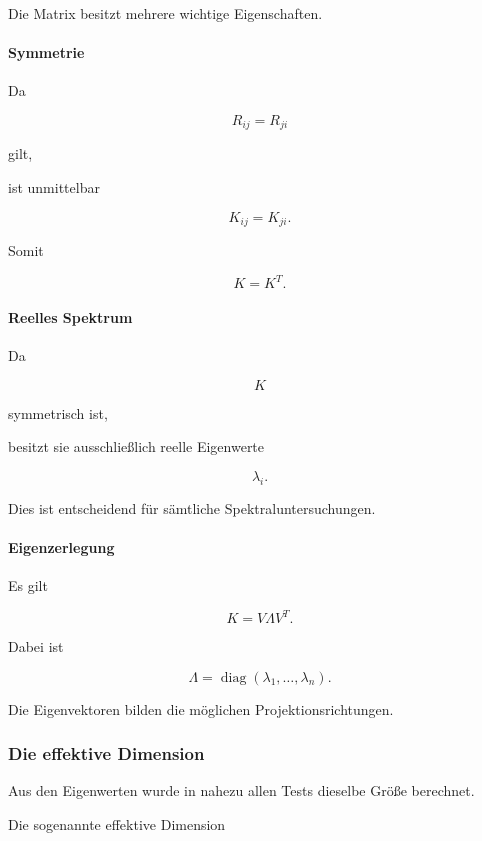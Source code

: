 Die Matrix besitzt mehrere wichtige Eigenschaften.

\paragraph{Symmetrie}

Da

\[
R_{ij}=R_{ji}
\]

gilt,

ist unmittelbar

\[
K_{ij}=K_{ji}.
\]

Somit

\[
K
=
K^T.
\]


\paragraph{Reelles Spektrum}

Da

\[
K
\]

symmetrisch ist,

besitzt sie ausschließlich reelle Eigenwerte

\[
\lambda_i.
\]

Dies ist entscheidend für sämtliche Spektraluntersuchungen.


\paragraph{Eigenzerlegung}

Es gilt

\[
K
=
V
\Lambda
V^T.
\]

Dabei ist

\[
\Lambda
=
\operatorname{diag}
(\lambda_1,\ldots,\lambda_n).
\]

Die Eigenvektoren bilden die möglichen Projektionsrichtungen.


\subsubsection*{Die effektive Dimension}

Aus den Eigenwerten wurde in nahezu allen Tests dieselbe Größe berechnet.

Die sogenannte effektive Dimension

